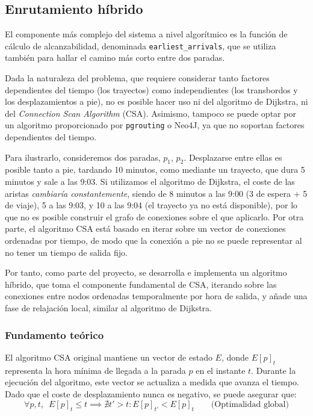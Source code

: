 \subsection{Enrutamiento híbrido}

El componente más complejo del sistema a nivel algorítmico es la función de cálculo de alcanzabilidad, denominada \texttt{earliest\_arrivals}, que se utiliza también para hallar el camino más corto entre dos paradas.

Dada la naturaleza del problema, que requiere considerar tanto factores dependientes del tiempo (los trayectos) como independientes (los transbordos y los desplazamientos a pie), no es posible hacer uso ni del algoritmo de Dijkstra\cite{dijkstra}, ni del \textit{Connection Scan Algorithm}\cite{csa} (CSA). Asimismo, tampoco se puede optar por un algoritmo proporcionado por \texttt{pgrouting} o Neo4J, ya que no soportan factores dependientes del tiempo.

Para ilustrarlo, consideremos dos paradas, $p_1$, $p_2$. Desplazarse entre ellas es posible tanto a pie, tardando 10 minutos, como mediante un trayecto, que dura 5 minutos y sale a las 9:03. Si utilizamos el algoritmo de Dijkstra, el coste de las aristas \textit{cambiaría constantemente}, siendo de 8 minutos a las 9:00 (3 de espera + 5 de viaje), 5 a las 9:03, y 10 a las 9:04 (el trayecto ya no está disponible), por lo que no es posible construir el grafo de conexiones sobre el que aplicarlo. Por otra parte, el algoritmo CSA está basado en iterar sobre un vector de conexiones ordenadas por tiempo, de modo que la conexión a pie no se puede representar al no tener un tiempo de salida fijo.

Por tanto, como parte del proyecto, se desarrolla e implementa un algoritmo híbrido, que toma el componente fundamental de CSA, iterando sobre las conexiones entre nodos ordenadas temporalmente por hora de salida, y añade una fase de relajación local, similar al algoritmo de Dijkstra.

\subsubsection{Fundamento teórico}

El algoritmo CSA original mantiene un vector de estado $E$, donde $E[p]_t$ representa la hora mínima de llegada a la parada $p$ en el instante $t$. Durante la ejecución del algoritmo, este vector se actualiza a medida que avanza el tiempo. Dado que el coste de desplazamiento nunca es negativo, se puede asegurar que:
\[
    \forall p, t, \enspace E[p]_t \leq t \implies \nexists t' > t: E[p]_{t'} < E[p]_t \qquad \text{(Optimalidad global)}
\]

